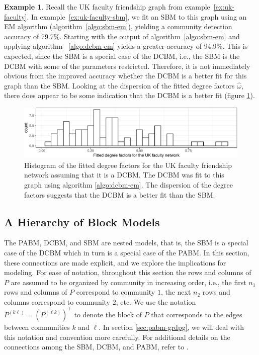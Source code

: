 \documentclass[
  12pt,
]{article}
\theoremstyle{definition}
\theoremstyle{definition}
\newtheorem{example}{Example}[section]
\theoremstyle{definition}
\theoremstyle{definition}
\theoremstyle{remark}
\begin{document}
\begin{example}
\label{ex:uk-faculty-dcbm-pabm}
Recall the UK faculty friendship graph from example~\ref{ex:uk-faculty}. 
In example~\ref{ex:uk-faculty-sbm}, we fit an SBM to this graph using an EM algorithm (algorithm~\ref{algo:sbm-em}), yielding a community detection accuracy of 79.7\%. 
Starting with the output of algorithm~\ref{algo:sbm-em} and applying algorithm ~\ref{algo:dcbm-em} yields a greater accuracy of 94.9\%. 
This is expected, since the SBM is a special case of the DCBM, i.e., the SBM is the DCBM with some of the parameters restricted. 
Therefore, it is not immediately obvious from the improved accuracy whether the DCBM is a better fit for this graph than the SBM. 
Looking at the dispersion of the fitted degree factors $\hat{\omega}$, there does appear to be some indication that the DCBM is a better fit (figure \ref{fig:uk-faculty-dcbm-omega}). 
\begin{figure}[H]

{\centering \includegraphics{draft_files/figure-latex/uk-faculty-dcbm-omega-1} 

}

\caption{Histogram of the fitted degree factors for the UK faculty friendship network assuming that it is a DCBM. The DCBM was fit to this graph using algorithm \ref{algo:dcbm-em}. The dispersion of the degree factors suggests that the DCBM is a better fit than the SBM.}\label{fig:uk-faculty-dcbm-omega}
\end{figure}
\end{example}

\hypertarget{sec:hierarchy}{%
\subsection{A Hierarchy of Block Models}\label{sec:hierarchy}}

The PABM, DCBM, and SBM are nested models, that is, the SBM is a special case of the DCBM which in turn is a special case of the PABM.
In this section, these connections are made explicit, and we explore the implications for modeling.
For ease of notation, throughout this section the rows and columns of \(P\) are assumed to be organized by community in increasing order, i.e., the first \(n_1\) rows and columns of \(P\) correspond to community \(1\), the next \(n_2\) rows and columns correspond to community \(2\), etc.
We use the notation \(P^{(k \ell)} = (P^{(\ell k)})^\top\) to denote the block of \(P\) that corresponds to the edges between communities \(k\) and \(\ell\).
In section \ref{sec:pabm-grdpg}, we will deal with this notation and convention more carefully.
For additional details on the connections among the SBM, DCBM, and PABM, refer to \citet{Noroozi2022}.
\end{document}
